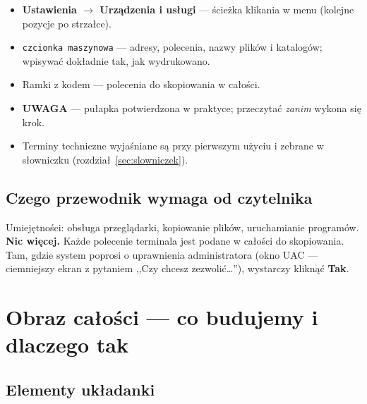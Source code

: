 \documentclass[11pt,a4paper]{article}
\begin{document}
\begin{itemize}
\item \textbf{Ustawienia $\to$ Urządzenia i usługi} --- ścieżka klikania w menu (kolejne pozycje po strzałce).
\item \texttt{czcionka maszynowa} --- adresy, polecenia, nazwy plików i katalogów; wpisywać dokładnie tak, jak wydrukowano.
\item Ramki z kodem --- polecenia do skopiowania w całości.
\item \textcolor{warnred}{\textbf{UWAGA}} --- pułapka potwierdzona w praktyce; przeczytać \emph{zanim} wykona się krok.
\item Terminy techniczne wyjaśniane są przy pierwszym użyciu i zebrane w słowniczku (rozdział~\ref{sec:slowniczek}).
\end{itemize}

\subsection{Czego przewodnik wymaga od czytelnika}

Umiejętności: obsługa przeglądarki, kopiowanie plików, uruchamianie programów. \textbf{Nic więcej.} Każde polecenie terminala jest podane w całości do skopiowania. Tam, gdzie system poprosi o uprawnienia administratora (okno UAC --- ciemniejszy ekran z pytaniem ,,Czy chcesz zezwolić\ldots''), wystarczy kliknąć \textbf{Tak}.

\section{Obraz całości --- co budujemy i dlaczego tak}
\label{sec:architektura}

\subsection{Elementy układanki}
\end{document}

